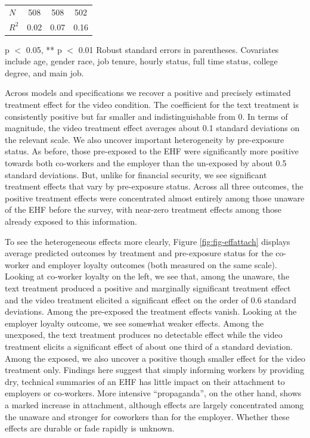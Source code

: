 \documentclass[
  11pt,
  oneside]{article}
\begin{document}
\begin{table}
\begin{threeparttable}
\begin{tabular}[t]{lccc}
\hspace{1em}$N$ & 508 & 508 & 502\\
\hspace{1em}$R^2$ & 0.02 & 0.07 & 0.16\\
\bottomrule
\end{tabular}
\begin{tablenotes}
\item * p $<$ 0.05, ** p $<$ 0.01 Robust standard errors in parentheses. Covariates include age, gender race, job tenure, hourly status, full time status, college degree, and main job.
\end{tablenotes}
\end{threeparttable}
\end{table}

Across models and specifications we recover a positive and precisely estimated treatment effect for the video condition. The coefficient for the text treatment is consistently positive but far smaller and indistinguishable from 0. In terms of magnitude, the video treatment effect averages about 0.1 standard deviations on the relevant scale. We also uncover important heterogeneity by pre-exposure status. As before, those pre-exposed to the EHF were significantly more positive towards both co-workers and the employer than the un-exposed by about 0.5 standard deviations. But, unlike for financial security, we see significant treatment effects that vary by pre-exposure status. Across all three outcomes, the positive treatment effects were concentrated almost entirely among those unaware of the EHF before the survey, with near-zero treatment effects among those already exposed to this information.

To see the heterogeneous effects more clearly, Figure \ref{fig:fig-effattach} displays average predicted outcomes by treatment and pre-exposure status for the co-worker and employer loyalty outcomes (both measured on the same scale). Looking at co-worker loyalty on the left, we see that, among the unaware, the text treatment produced a positive and marginally significant treatment effect and the video treatment elicited a significant effect on the order of 0.6 standard deviations. Among the pre-exposed the treatment effects vanish. Looking at the employer loyalty outcome, we see somewhat weaker effects. Among the unexposed, the text treatment produces no detectable effect while the video treatment elicits a significant effect of about one third of a standard deviation. Among the exposed, we also uncover a positive though smaller effect for the video treatment only. Findings here suggest that simply informing workers by providing dry, technical summaries of an EHF has little impact on their attachment to employers or co-workers. More intensive ``propaganda'', on the other hand, shows a marked increase in attachment, although effects are largely concentrated among the unaware and stronger for coworkers than for the employer. Whether these effects are durable or fade rapidly is unknown.
\end{document}
